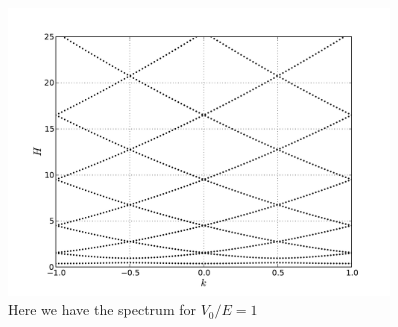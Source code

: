 \documentclass[11pt,a4paper]{article}
\begin{document}
\begin{figure}[t]
\centering
\includegraphics[width=0.9\textwidth]{ener_spectrum/spectr_v01.pdf}
\caption{Here we have the spectrum for $V_0/E=1$} \label{fig:ener2}
\end{figure}
\end{document}
